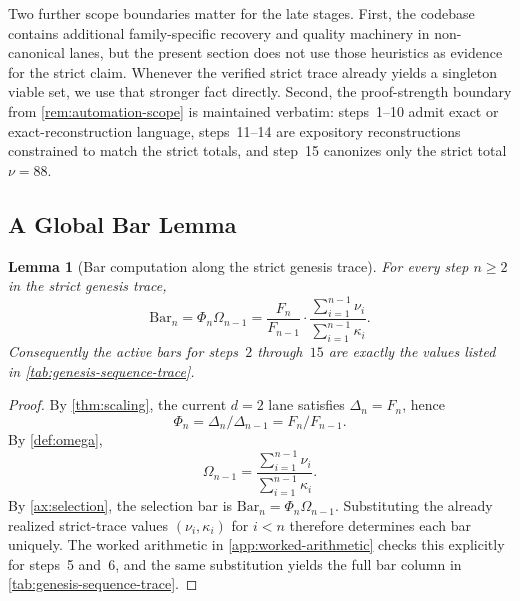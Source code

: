 \documentclass[11pt,a4paper]{article}
\theoremstyle{plain}
\newtheorem{lemma}[theorem]{Lemma}
\theoremstyle{definition}
\theoremstyle{remark}
\begin{document}
Two further scope boundaries matter for the late stages.
First, the codebase contains additional family-specific recovery and quality
machinery in non-canonical lanes, but the present section does not use those
heuristics as evidence for the strict claim.
Whenever the verified strict trace already yields a singleton viable set, we use
that stronger fact directly.
Second, the proof-strength boundary from \cref{rem:automation-scope} is
maintained verbatim:
steps~1--10 admit exact or exact-reconstruction language,
steps~11--14 are expository reconstructions constrained to match the strict
totals, and step~15 canonizes only the strict total $\nu=88$.

\subsection{A Global Bar Lemma}
\label{subsec:genesis-bar-lemma}

\begin{lemma}[Bar computation along the strict genesis trace]
\label{lem:genesis-bar-lemma}
For every step $n \ge 2$ in the strict genesis trace,
\[
  \mathrm{Bar}_n
  =
  \Phi_n \Omega_{n-1}
  =
  \frac{F_n}{F_{n-1}}
  \cdot
  \frac{\sum_{i=1}^{n-1}\nu_i}{\sum_{i=1}^{n-1}\kappa_i}.
\]
Consequently the active bars for steps~$2$ through~$15$ are exactly the values
listed in \cref{tab:genesis-sequence-trace}.
\end{lemma}

\begin{proof}
By \cref{thm:scaling}, the current $d=2$ lane satisfies $\Delta_n=F_n$, hence
\[
  \Phi_n = \Delta_n/\Delta_{n-1} = F_n/F_{n-1}.
\]
By \cref{def:omega},
\[
  \Omega_{n-1} = \frac{\sum_{i=1}^{n-1}\nu_i}{\sum_{i=1}^{n-1}\kappa_i}.
\]
By \cref{ax:selection}, the selection bar is
$\mathrm{Bar}_n = \Phi_n \Omega_{n-1}$.
Substituting the already realized strict-trace values
$(\nu_i,\kappa_i)$ for $i<n$ therefore determines each bar uniquely.
The worked arithmetic in \cref{app:worked-arithmetic} checks this explicitly for
steps~5 and~6, and the same substitution yields the full bar column in
\cref{tab:genesis-sequence-trace}.
\end{proof}
\end{document}
